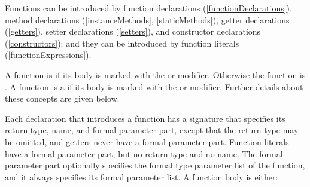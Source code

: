 \documentclass[makeidx]{article}
\begin{document}
\LMHash{}%
Functions can be introduced by function declarations
(\ref{functionDeclarations}),
method declarations (\ref{instanceMethods}, \ref{staticMethods}),
getter declarations (\ref{getters}),
setter declarations (\ref{setters}),
and constructor declarations (\ref{constructors});
and they can be introduced by function literals (\ref{functionExpressions}).

\LMHash{}%
A function is 
if its body is marked with the \ASYNC{} or \code{\ASYNC*} modifier.
Otherwise the function is .
A function is a 
if its body is marked with the \code{\SYNC*} or \code{\ASYNC*} modifier.
Further details about these concepts are given below.


\LMHash{}%
Each declaration that introduces a function has a signature that specifies
its return type, name, and formal parameter part,
except that the return type may be omitted,
and getters never have a formal parameter part.
Function literals have a formal parameter part, but no return type and no name.
The formal parameter part optionally specifies
the formal type parameter list of the function,
and it always specifies its formal parameter list.
A function body is either:
\end{document}
